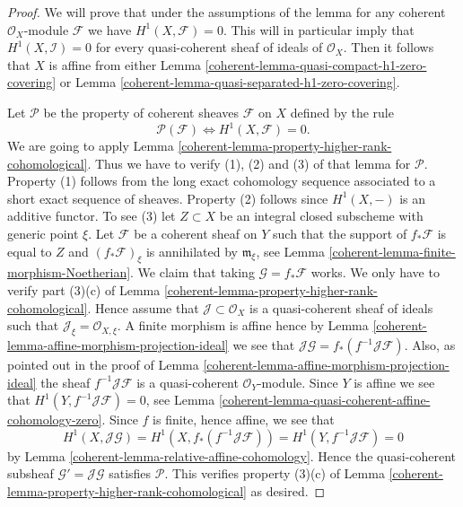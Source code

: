 \begin{proof}

We will prove that under the assumptions of the lemma for any coherent
$\mathcal{O}_X$-module $\mathcal{F}$ we have $H^1(X, \mathcal{F}) = 0$.
This will in particular imply that $H^1(X, \mathcal{I}) = 0$
for every quasi-coherent sheaf of ideals of $\mathcal{O}_X$. Then it
follows that $X$ is affine from either
Lemma \ref{coherent-lemma-quasi-compact-h1-zero-covering} or
Lemma \ref{coherent-lemma-quasi-separated-h1-zero-covering}.

\medskip\noindent
Let $\mathcal{P}$ be the property of coherent sheaves
$\mathcal{F}$ on $X$ defined by the rule
$$
\mathcal{P}(\mathcal{F}) \Leftrightarrow H^1(X, \mathcal{F}) = 0.
$$
We are going to apply Lemma \ref{coherent-lemma-property-higher-rank-cohomological}.
Thus we have to verify (1), (2) and (3) of that lemma for $\mathcal{P}$.
Property (1) follows from the long exact cohomology sequence associated
to a short exact sequence of sheaves. Property (2) follows since
$H^1(X, -)$ is an additive functor. To see (3) let $Z \subset X$ be
an integral closed subscheme with generic point $\xi$.
Let $\mathcal{F}$ be a coherent sheaf on $Y$ such that
the support of $f_*\mathcal{F}$ is equal to $Z$
and $(f_*\mathcal{F})_\xi$ is annihilated by $\mathfrak m_\xi$,
see Lemma \ref{coherent-lemma-finite-morphism-Noetherian}. We claim that
taking $\mathcal{G} = f_*\mathcal{F}$ works. We only have to verify
part (3)(c) of Lemma \ref{coherent-lemma-property-higher-rank-cohomological}.
Hence assume that $\mathcal{J} \subset \mathcal{O}_X$ is a
quasi-coherent sheaf of ideals such that
$\mathcal{J}_\xi = \mathcal{O}_{X, \xi}$.
A finite morphism is affine hence by
Lemma \ref{coherent-lemma-affine-morphism-projection-ideal} we see that
$\mathcal{J}\mathcal{G} = f_*(f^{-1}\mathcal{J}\mathcal{F})$.
Also, as pointed out in the proof of
Lemma \ref{coherent-lemma-affine-morphism-projection-ideal} the sheaf
$f^{-1}\mathcal{J}\mathcal{F}$ is a quasi-coherent $\mathcal{O}_Y$-module.
Since $Y$ is affine we see that $H^1(Y, f^{-1}\mathcal{J}\mathcal{F}) = 0$,
see Lemma \ref{coherent-lemma-quasi-coherent-affine-cohomology-zero}.
Since $f$ is finite, hence affine, we see that
$$
H^1(X, \mathcal{J}\mathcal{G}) =
H^1(X, f_*(f^{-1}\mathcal{J}\mathcal{F})) =
H^1(Y, f^{-1}\mathcal{J}\mathcal{F}) = 0
$$
by Lemma \ref{coherent-lemma-relative-affine-cohomology}.
Hence the quasi-coherent subsheaf $\mathcal{G}' = \mathcal{J}\mathcal{G}$
satisfies $\mathcal{P}$. This verifies property (3)(c) of
Lemma \ref{coherent-lemma-property-higher-rank-cohomological} as desired.
\end{proof}

